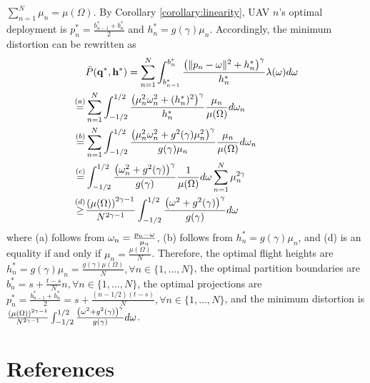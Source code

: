 \documentclass[12pt,onecolumn,final,letterpaper]{IEEEtran}
\newif\ifarxiv\arxivfalse
\renewcommand{\vp}{\mathbf q}
\newcommand{\df}{\ensuremath{\lam}}         %
\newcommand{\bP}{\ensuremath{\vp}}          %
\newcommand{\abPo}{\ensuremath{\bar{P}}}  %
\newcommand{\bH}{\ensuremath{\vh}}          %
\newcommand{\Vor}{\ensuremath{\mathcal{V}}}         %
\newcommand{\philippstart}{\color{black}}
\newcommand{\philippend}{\color{black}}
\newcommand{\junend}{\color{black}}
\begin{document}
$\sum_{n=1}^{N}\mu_n=\mu(\Omega)$.  By Corollary \ref{corollary:linearity}, UAV $n$'s optimal deployment is
$p^*_n=\frac{b^*_{n-1}+b^*_{n}}{2}$ and $h^*_n=g(\gamma)\mu_n$.  Accordingly, the minimum distortion can be rewritten as
%
\begin{align}
    &\abPo(\bP^*,\bH^*)=\sum_{n=1}^{N}\int_{b^*_{n-1}}^{b^*_{n}}\frac{\left(\|p_n-\ome\|^2+h^*_n\right)^{\gamma}}{h^*_n}\df(\ome) d\ome\\
    \overset{(a)}{=}&\sum_{n=1}^{N}\int_{-1/2}^{1/2} \frac{\left(\mu^2_n\ome^2_n+(h^*_n)^2\right)^{\gamma}}{h^*_n} \frac{\mu_n}{\mu(\Omega)}d\ome_n\\
    \overset{(b)}{=}&\sum_{n=1}^{N}\int_{-1/2}^{1/2}\frac{\left(\mu^2_n\ome^2_n+g^2(\gamma)\mu^2_n\right)^{\gamma}}{g(\gamma)\mu_n} \frac{\mu_n}{\mu(\Omega)}d\ome_n\\
    \overset{(c)}{=}&\int_{-1/2}^{1/2}\frac{\left(\ome^2_n+g^2(\gamma)\right)^{\gamma}}{g(\gamma)} \frac{1}{\mu(\Omega)}d\ome\sum_{n=1}^{N}\mu^{2\gamma}_n\\
    \overset{(d)}{\ge}&\frac{\left(\mu(\Omega)\right)^{2\gamma-1}}{N^{2\gamma-1}}\int_{-1/2}^{1/2}\frac{\left(\ome^2+g^2(\gamma)\right)^{\gamma}}{g(\gamma)} d\ome
\end{align}
%
where (a) follows from $\omega_n=\frac{p_n-\omega}{\mu_n}$, (b) follows from $h^*_n=g(\gamma)\mu_n$, and (d) is an equality
if and only if $\mu_n=\frac{\mu(\Omega)}{N}$.  Therefore, the optimal flight heights are
$h^*_n=g(\gamma)\mu_n=\frac{g(\gamma)\mu(\Omega)}{N}, \forall n\in\{1,\dots,N\}$, the optimal partition boundaries are
$b^*_n=s+\frac{t-s}{N}n, \forall n\in\{1,\dots,N\}$, the optimal projections are
$p^*_n=\frac{b^*_{n-1}+b^*_{n}}{2}=s+\frac{(n-1/2)(t-s)}{N}, \forall n\in\{1,\dots,N\}$, and the minimum distortion is
$\frac{\left(\mu(\Omega)\right)^{2\gamma-1}}{N^{2\gamma-1}}\int_{-1/2}^{1/2}\frac{\left(\omega^2+g^2(\gamma)\right)^{\gamma}}{g(\gamma)}
d\omega$.
\fi \junend \philippstart
%
\philippend
\section*{References} \ifarxiv \else \vspace{-4ex} \fi \printbibliography
\end{document}
